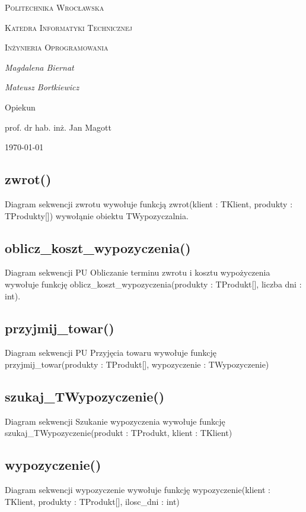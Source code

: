\documentclass{article}
\begin{document}
	
	\begin{titlepage}
		\centering
		{\scshape\LARGE Politechnika Wrocławska \par}
		{\scshape\Large Katedra Informatyki Technicznej\par}
		
		\vspace{1cm}
		{\scshape\Large Inżynieria Oprogramowania\par}
		\vspace{1.5cm}
		{\huge\bfseries \par}
		\vspace{2cm}
		{\Large\itshape Magdalena Biernat\par}
		{\Large\itshape Mateusz Bortkiewicz\par}
		\vfill
		Opiekun\par
		prof. dr hab. inż. Jan Magott 
		
		\vfill
		{\large \today\par}
	\end{titlepage}
	\newpage
	\subsection{zwrot()}
	Diagram sekwencji zwrotu wywołuje funkcją zwrot(klient : TKlient, produkty : TProdukty[]) wywołąnie obiektu TWypozyczalnia.
	
	\subsection{oblicz\_koszt\_wypozyczenia()}
	Diagram sekwencji PU Obliczanie terminu zwrotu i kosztu wypożyczenia wywołuje funkcję oblicz\_koszt\_wypozyczenia(produkty : TProdukt[], liczba dni : int).
	
	\subsection{przyjmij\_towar()}
	Diagram sekwencji PU Przyjęcia towaru wywołuje funkcję przyjmij\_towar(produkty : TProdukt[], wypozyczenie : TWypozyczenie)
	
	\subsection{szukaj\_TWypozyczenie()}
	Diagram sekwencji Szukanie wypozyczenia wywołuje funkcję szukaj\_TWypozyczenie(produkt : TProdukt, klient : TKlient)
	
	\subsection{wypozyczenie()}
	Diagram sekwencji wypozyczenie wywołuje funkcję wypozyczenie(klient : TKlient, produkty : TProdukt[], ilosc\_dni : int)
\end{document}

